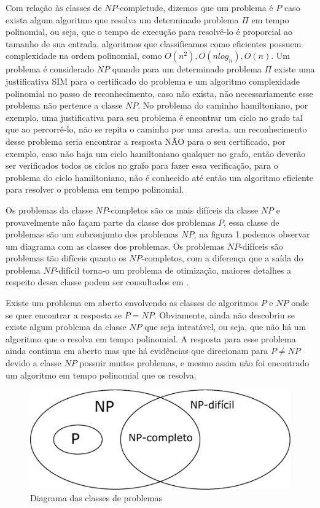 Com relação às classes de $NP$-completude, dizemos que um problema é $P$ caso exista algum algoritmo que resolva um determinado problema $\Pi$ em tempo polinomial, ou seja, que o tempo de execução para resolvê-lo é proporcial ao tamanho de sua entrada, algoritmos que classificamos como eficientes possuem complexidade na ordem polinomial, como $O(n^2), O(n log_n), O(n)$. Um problema é considerado $NP$ quando para um determinado problema $\Pi$ existe uma justificativa SIM para o certificado do problema e um algoritmo complexidade polinomial no passo de reconhecimento, caso não exista, não necessariamente esse problema não pertence a classe $NP$. No problema do caminho hamiltoniano, por exemplo, uma justificativa para seu problema é encontrar um ciclo no grafo tal que ao percorrê-lo, não se repita o caminho por uma aresta, um reconhecimento desse problema seria encontrar a resposta NÃO para o seu certificado, por exemplo, caso não haja um ciclo hamiltoniano qualquer no grafo, então deverão ser verificados todos os ciclos no grafo para fazer essa verificação, para o problema do ciclo hamiltoniano, não é conhecido até então um algoritmo eficiente para resolver o problema em tempo polinomial.

Os problemas da classe $NP$-completos são os mais difíceis da classe $NP$ e provavelmente não façam parte da classe dos problemas $P$, essa classe de problemas são um subconjunto dos problemas $NP$, na figura 1 podemos observar um diagrama com as classes dos problemas. Os problemas $NP$-difíceis são problemas tão difíceis quanto os $NP$-completos, com a diferença que a saída do problema $NP$-difícil torna-o um problema de otimização, maiores detalhes a respeito dessa classe podem ser consultados em \cite{JaymeGrafosNovo}.

Existe um problema em aberto envolvendo as classes de algoritmos $P$ e $NP$ onde se quer encontrar a resposta se $P = NP$. Obviamente, ainda não descobriu se existe algum problema da classe $NP$ que seja intratável, ou seja, que não há um algoritmo que o resolva em tempo polinomial. A resposta para esse problema ainda continua em aberto mas que há evidências que direcionam para $P \neq NP$ devido a classe $NP$ possuir muitos problemas, e mesmo assim não foi encontrado um algoritmo em tempo polinomial que os resolva.

\begin{figure}
    \centering
    \includegraphics{pictures/diagrama_np.pdf}
    \caption{Diagrama das classes de problemas}
    \label{fig:np_problems}
\end{figure}

